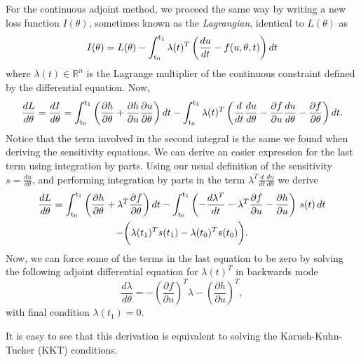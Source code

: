 For the continuous adjoint method, we proceed the same way by writing a new loss function $I(\theta)$, sometimes known as the \textit{Lagrangian}, identical to $L(\theta)$ as 
\begin{equation}
    I(\theta) = L(\theta) - \operatorname{\int_{t_0}^{t_1}} \lambda(t)^T \left( \frac{du}{dt} - f(u, \theta, t) \right) dt
\end{equation}
where $\lambda(t) \in \mathbb R^n$ is the Lagrange multiplier of the continuous constraint defined by the differential equation. Now, 
\begin{equation}
    \frac{dL}{d\theta} = \frac{dI}{d\theta} = 
    \operatorname{\int_{t_0}^{t_1}} \left( \frac{\partial h}{\partial \theta} + \frac{\partial h}{\partial u} \frac{\partial u}{\partial \theta} \right) dt
    - 
    \operatorname{\int_{t_0}^{t_1}} \lambda(t)^T \left( \frac{d}{dt} \frac{du}{d\theta} - \frac{\partial f}{\partial u} \frac{du}{d\theta} - \frac{\partial f}{\partial \theta} \right) dt.
\end{equation}
Notice that the term involved in the second integral is the same we found when deriving the sensitivity equations. 
We can derive an easier expression for the last term using integration by parts. 
Using our usual definition of the sensitivity $s = \frac{du}{d\theta}$, and performing integration by parts in the term $\lambda^T \frac{d}{dt} \frac{du}{d\theta}$ we derive 
\begin{multline}
    \frac{dL}{d\theta}
    = 
    \operatorname{\int_{t_0}^{t_1}} \left( \frac{\partial h}{\partial \theta} + \lambda^T \frac{\partial f}{\partial \theta} \right) dt 
    - 
    \operatorname{\int_{t_0}^{t_1}} \left( - \frac{d\lambda^T}{dt} - \lambda^T \frac{\partial f}{\partial u} - \frac{\partial h}{\partial u} \right) \, s(t) \, dt \\
    -
    \bigg ( \lambda(t_1)^T s(t_1) - \lambda(t_0)^T s(t_0) \bigg ).
    \label{eq:continous-adjoint-loss}
\end{multline}
Now, we can force some of the terms in the last equation to be zero by solving the following adjoint differential equation for $\lambda(t)^T$ in backwards mode
\begin{equation}
    \frac{d\lambda}{d\theta} = - \left(\frac{\partial f}{\partial u}\right)^T \lambda - \left( \frac{\partial h}{\partial u} \right)^T,
    \label{eq:continuous-adjoint}
\end{equation}
with final condition $\lambda(t_1) = 0$. 

It is easy to see that this derivation is equivalent to solving the Karush-Kuhn-Tucker (KKT) conditions. 